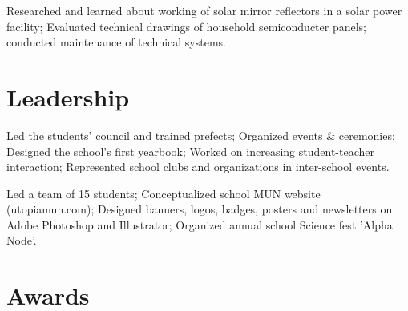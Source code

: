 \documentclass[letterpaper]{deedy-resume} %
\begin{document}
\begin{minipage}[t]{0.66\textwidth}

Researched and learned about working of solar mirror reflectors in a solar power facility; Evaluated technical drawings of household semiconducter panels; conducted maintenance of technical systems.

\sectionspace %


\section{Leadership}


Led the students’ council and trained prefects; Organized events \& ceremonies; Designed the school’s first yearbook; Worked on increasing student-teacher interaction; Represented school clubs and organizations in inter-school events.

\sectionspace %

Led a team of 15 students; Conceptualized school MUN website (utopiamun.com); Designed banners, logos, badges, posters and newsletters on Adobe Photoshop and Illustrator; Organized annual school Science fest 'Alpha Node'.

\sectionspace %


\section{Awards} 


\end{minipage}
\end{document}
